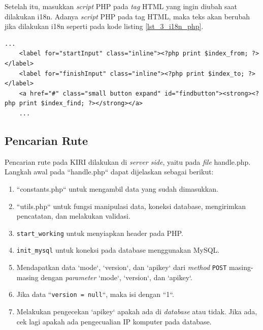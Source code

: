 Setelah itu, masukkan \textit{script} PHP pada \textit{tag} HTML yang ingin diubah saat dilakukan i18n. Adanya \textit{script} PHP pada tag HTML, maka teks akan berubah jika dilakukan i18n seperti pada kode listing \ref{lst_3_i18n_php}.

\begin{lstlisting}[caption=Script PHP untuk Internationalization,label = {lst_3_i18n_php}]
	...
	<label for="startInput" class="inline"><?php print $index_from; ?></label>
	<label for="finishInput" class="inline"><?php print $index_to; ?></label>
	<a href="#" class="small button expand" id="findbutton"><strong><?php print $index_find; ?></strong></a>
	...
\end{lstlisting}

\subsection{Pencarian Rute}
Pencarian rute pada KIRI dilakukan di \textit{server side}, yaitu pada \textit{file} handle.php. Langkah awal pada ``handle.php`` dapat dijelaskan sebagai berikut:
\begin{enumerate}
	\item ``constants.php`` untuk mengambil data yang sudah dimasukkan.
	\item ``utils.php`` untuk fungsi manipulasi data, koneksi database, mengirimkan pencatatan, dan melakukan validasi.
	\item \verb!start_working! untuk menyiapkan header pada PHP.
	\item \verb!init_mysql! untuk koneksi pada database menggunakan MySQL. 
	\item Mendapatkan data `mode`, `version`, dan `apikey` dari \textit{method} \verb!POST! masing-masing dengan \textit{parameter} `mode`, `version`, dan `apikey`.
	\item Jika data ``\texttt{version = null}``, maka isi dengan ``1``. 
	\item Melakukan pengecekan `apikey` apakah ada di \textit{database} atau tidak. Jika ada, cek lagi apakah ada pengecualian IP komputer pada database.
\end{enumerate}

